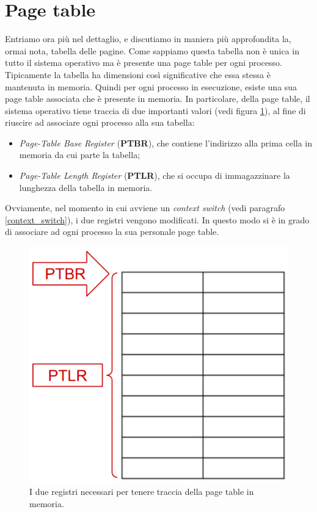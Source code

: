% 
\section{Page table}\label{page_table}
Entriamo ora più nel dettaglio, e discutiamo in maniera più approfondita la, ormai nota, tabella delle pagine. Come sappiamo questa tabella non è unica in tutto il sistema operativo ma è presente una page table per ogni processo. Tipicamente la tabella ha dimensioni così significative che essa stessa è mantenuta in memoria. Quindi per ogni processo in esecuzione, esiste una sua page table associata che è presente in memoria. In particolare, della page table, il sistema operativo tiene traccia di due importanti valori (vedi figura \ref{fig:page_table_registers}), al fine di riuscire ad associare ogni processo alla sua tabella:
\vspace{-5px}
\begin{itemize}
\setlength{\itemsep}{-.15 em}
    \item \textit{Page-Table Base Register} (\textbf{PTBR}), che contiene l'indirizzo alla prima cella in memoria da cui parte la tabella;
    \item \textit{Page-Table Length Register} (\textbf{PTLR}), che si occupa di immagazzinare la lunghezza della tabella in memoria. 
\end{itemize}
Ovviamente, nel momento in cui avviene un \textit{context switch} (vedi paragrafo \ref{context_switch}), i due registri vengono modificati. In questo modo si è in grado di associare ad ogni processo la sua personale page table.
\begin{figure}[h]
    \centering
    \includegraphics[width = .3\textwidth]{../res/imgs/main memory/page_table_registers.png}
    \caption{I due registri necessari per tenere traccia della page table in memoria.}
    \label{fig:page_table_registers}
\end{figure}

% 
